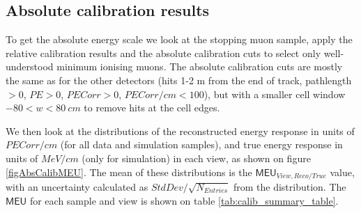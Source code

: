 \documentclass[12pt,a4paper]{article}
\begin{document}
\FloatBarrier
\subsection{Absolute calibration results}
To get the absolute energy scale we look at the stopping muon sample, apply the relative calibration results and the absolute calibration cuts to select only well-understood minimum ionising muons. The absolute calibration cuts are mostly the same as for the other detectors (hits 1-2 m from the end of track, pathlength $>0$, $PE>0$, $PECorr > 0$, $PECorr/cm < 100$), but with a smaller cell window $-80<w<80\ \unit{cm}$ to remove hits at the cell edges.

We then look at the distributions of the reconstructed energy response in units of $PECorr/cm$ (for all data and simulation samples), and true energy response in units of $MeV/cm$ (only for simulation) in each view, as shown on figure \ref{figAbsCalibMEU}. The mean of these distributions is the $\textsf{MEU}_{View,Reco/True}$ value, with an uncertainty calculated as $StdDev/\sqrt{N_{Entries}}$ from the distribution. The $\textsf{MEU}$ for each sample and view is shown on table \ref{tab:calib_summary_table}.
\end{document}
